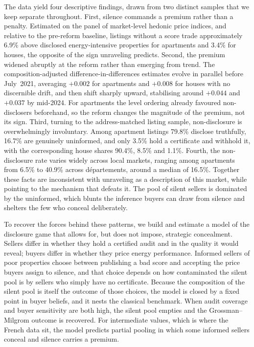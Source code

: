 The data yield four descriptive findings, drawn from two distinct samples that we keep separate
throughout. First, silence commands a premium rather than a penalty. Estimated on the panel of
market-level hedonic price indices, and relative to the pre-reform baseline, listings without a
score trade approximately 6.9\% above disclosed energy-intensive properties for apartments and
3.4\% for houses, the opposite of the sign unraveling predicts. Second, the premium widened
abruptly at the reform rather than emerging from trend. The composition-adjusted
difference-in-differences estimates evolve in parallel before July~2021, averaging $+0.002$ for
apartments and $+0.008$ for houses with no discernible drift, and then shift sharply upward,
stabilising around $+0.044$ and $+0.037$ by mid-2024. For apartments the level ordering already
favoured non-disclosers beforehand, so the reform changes the magnitude of the premium, not its sign. Third, turning to the address-matched listing sample, non-disclosure is
overwhelmingly involuntary. Among apartment listings 79.8\% disclose truthfully, 16.7\% are
genuinely uninformed, and only 3.5\% hold a certificate and withhold it, with the corresponding
house shares 90.4\%, 8.5\% and 1.1\%.
Fourth, the non-disclosure rate varies widely across local markets, ranging among
apartments from 6.5\% to 40.9\% across d\'epartements, around a median of 16.5\%. Together
these facts are inconsistent with unraveling as a description of this market, while pointing to
the mechanism that defeats it. The pool of silent sellers is dominated by the uninformed, which
blunts the inference buyers can draw from silence and shelters the few who conceal
deliberately.

To recover the forces behind these patterns, we build and estimate a model of the disclosure
game that allows for, but does not impose, strategic concealment. Sellers differ in whether they
hold a certified audit and in the quality it would reveal; buyers differ in whether they price
energy performance. Informed sellers of poor properties choose between publishing a bad score
and accepting the price buyers assign to silence, and that choice depends on how contaminated
the silent pool is by sellers who simply have no certificate. Because the composition of the
silent pool is itself the outcome of those choices, the model is closed by a fixed point in
buyer beliefs, and it nests the classical benchmark. When audit coverage and buyer sensitivity
are both high, the silent pool empties and the Grossman--Milgrom outcome is recovered. For
intermediate values, which is where the French data sit, the model predicts partial pooling in
which some informed sellers conceal and silence carries a premium.

